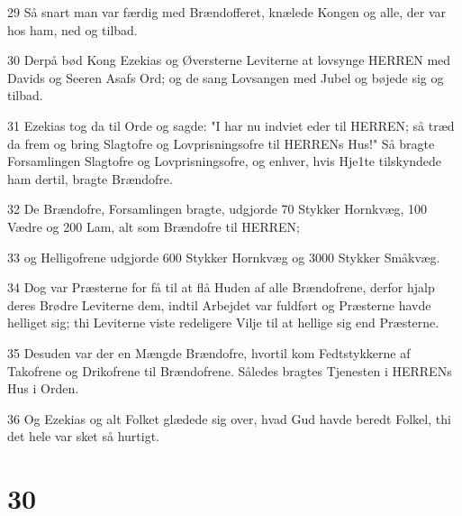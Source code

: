 \par 29 Så snart man var færdig med Brændofferet, knælede Kongen og alle, der var hos ham, ned og tilbad.
\par 30 Derpå bød Kong Ezekias og Øversterne Leviterne at lovsynge HERREN med Davids og Seeren Asafs Ord; og de sang Lovsangen med Jubel og bøjede sig og tilbad.
\par 31 Ezekias tog da til Orde og sagde: "I har nu indviet eder til HERREN; så træd da frem og bring Slagtofre og Lovprisningsofre til HERRENs Hus!" Så bragte Forsamlingen Slagtofre og Lovprisningsofre, og enhver, hvis Hje1te tilskyndede ham dertil, bragte Brændofre.
\par 32 De Brændofre, Forsamlingen bragte, udgjorde 70 Stykker Hornkvæg, 100 Vædre og 200 Lam, alt som Brændofre til HERREN;
\par 33 og Helligofrene udgjorde 600 Stykker Hornkvæg og 3000 Stykker Småkvæg.
\par 34 Dog var Præsterne for få til at flå Huden af alle Brændofrene, derfor hjalp deres Brødre Leviterne dem, indtil Arbejdet var fuldført og Præsterne havde helliget sig; thi Leviterne viste redeligere Vilje til at hellige sig end Præsterne.
\par 35 Desuden var der en Mængde Brændofre, hvortil kom Fedtstykkerne af Takofrene og Drikofrene til Brændofrene. Således bragtes Tjenesten i HERRENs Hus i Orden.
\par 36 Og Ezekias og alt Folket glædede sig over, hvad Gud havde beredt Folkel, thi det hele var sket så hurtigt.

\chapter{30}

